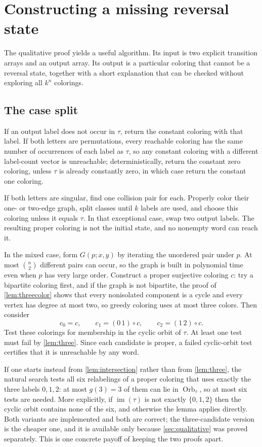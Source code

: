 \documentclass[11pt,a4paper]{article}
\numberwithin{equation}{section}
\theoremstyle{definition}
\theoremstyle{remark}
\newcommand{\im}{\operatorname{im}}
\newcommand{\Orb}{\operatorname{Orb}}
\begin{document}
\section{Constructing a missing reversal state}\label{sec:algorithm}

The qualitative proof yields a useful algorithm. Its input is two explicit
transition arrays and an output array. Its output is a particular coloring
that cannot be a reversal state, together with a short explanation that can
be checked without exploring all $k^n$ colorings.

\subsection{The case split}

If an output label does not occur in $\tau$, return the constant coloring
with that label. If both letters are permutations, every reachable coloring
has the same number of occurrences of each label as $\tau$, so any constant
coloring with a different label-count vector is unreachable; deterministically,
return the constant zero coloring, unless $\tau$ is already constantly zero,
in which case return the constant one coloring.

If both letters are singular, find one collision pair for each. Properly
color their one- or two-edge graph, split classes until $k$ labels are used,
and choose this coloring unless it equals $\tau$. In that exceptional case,
swap two output labels. The resulting proper coloring is not the initial
state, and no nonempty word can reach it.

In the mixed case, form $G(p;x,y)$ by iterating the unordered pair under $p$.
At most $\binom n2$ different pairs can occur, so the graph is built in
polynomial time even when $p$ has very large order. Construct a proper
surjective coloring $c$: try a bipartite coloring first, and if the graph is
not bipartite, the proof of \cref{lem:threecolor} shows that every nonisolated
component is a cycle and every vertex has degree at most two, so greedy
coloring uses at most three colors. Then consider
\[
 c_0=c,\qquad c_1=(0\,1)\circ c,\qquad c_2=(1\,2)\circ c.
\]
Test these colorings for membership in the cyclic orbit of $\tau$. At least
one test must fail by \cref{lem:three}. Since each candidate is proper, a
failed cyclic-orbit test certifies that it is unreachable by any word.

\begin{remark}
\label{rem:sixtests}
If one starts instead from \cref{lem:intersection} rather than from
\cref{lem:three}, the natural search tests all six relabelings of a proper
coloring that uses exactly the three labels $0,1,2$: at most $g(3)=3$ of them
can lie in $\Orb_\tau$, so at most six tests are needed. More explicitly, if
$\im(\tau)$ is not exactly $\{0,1,2\}$ then the cyclic orbit contains none of
the six, and otherwise the lemma applies directly. Both variants are
implemented and both are correct; the three-candidate version is the cheaper
one, and it is available only because \cref{sec:qualitative} was proved
separately. This is one concrete payoff of keeping the two proofs apart.
\end{remark}
\end{document}
